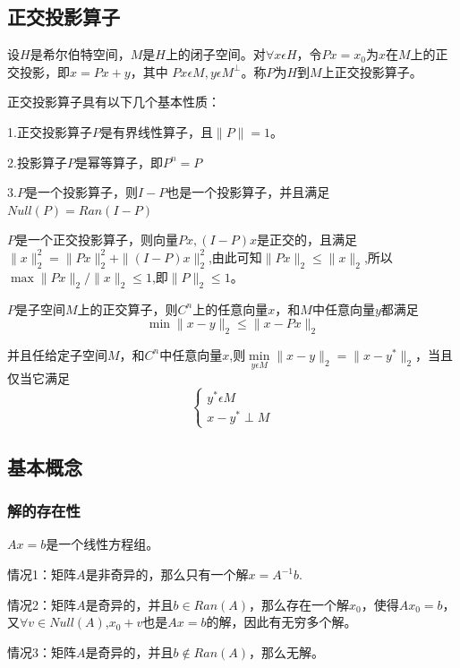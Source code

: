 \documentclass{article}
\begin{document}
\subsection{正交投影算子}
\begin{definition}
设$H$是希尔伯特空间，$M$是$H$上的闭子空间。对$\forall x\epsilon H$，令$Px=x_0$为$x$在$M$上的正交投影，即$x=Px+y$，其中 $Px\epsilon M,y\epsilon M^\perp$。称$P$为$H$到$M$上正交投影算子。
\end{definition}

正交投影算子具有以下几个基本性质：

1.正交投影算子$P$是有界线性算子，且$\parallel P \parallel=1$。

2.投影算子$P$是幂等算子，即$P^n=P$

3.$P$是一个投影算子，则$I-P$也是一个投影算子，并且满足$Null(P)=Ran(I-P)$

$P$是一个正交投影算子，则向量$Px,(I-P)x$是正交的，且满足$\parallel x\parallel _2^2=\parallel Px\parallel _2^2+\parallel (I-P)x\parallel _2^2$,由此可知$\parallel Px\parallel _2\leqslant \parallel x\parallel _2$,所以$\max \parallel Px\parallel _2 /\parallel x\parallel _2\leqslant 1$,即$\parallel P\parallel _2\leqslant 1$。
\begin{thm}
$P$是子空间$M$上的正交算子，则$C^n$上的任意向量$x$，和$M$中任意向量$y$都满足
$$\min \parallel x-y\parallel _2\leqslant \parallel x-Px\parallel _2$$
\end{thm}

并且任给定子空间$M$，和$C^n$中任意向量$x$,则$\min \limits_{y\epsilon M} \parallel x-y\parallel _2= \parallel x-y^*\parallel _2$，当且仅当它满足
$$\begin{cases}
y^*  \epsilon M \\
x-y^*\perp M
\end{cases}
$$

\subsection{基本概念}
\subsubsection{解的存在性}
$Ax=b$是一个线性方程组。

情况1：矩阵$A$是非奇异的，那么只有一个解$x=A^{-1}b$.

情况2：矩阵$A$是奇异的，并且$b\in Ran(A)$，那么存在一个解$x_0$，使得$Ax_0=b$，又$\forall v \in Null(A)$,$x_0+v$也是$Ax=b$的解，因此有无穷多个解。

情况3：矩阵$A$是奇异的，并且$b\notin Ran(A)$，那么无解。
\end{document}
